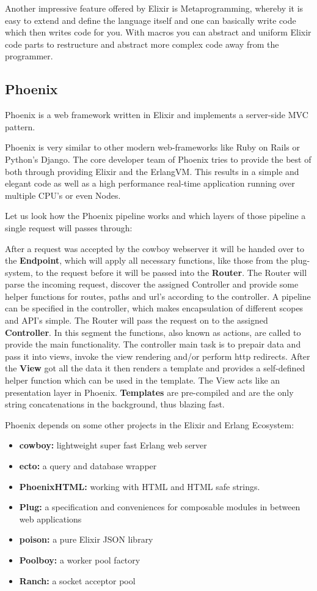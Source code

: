 Another impressive feature offered by Elixir is Metaprogramming, whereby it is easy to extend and define the language itself and one can basically write code which then writes code for you. With macros you can abstract and uniform Elixir code parts to restructure and abstract more complex code away from the programmer. 
\subsection{Phoenix}
Phoenix is a web framework written in Elixir and implements a server-side MVC pattern. 

Phoenix is very similar to other modern web-frameworks like Ruby on Rails or Python's Django. The core developer team of Phoenix tries to provide the best of both through providing  Elixir and the ErlangVM. This results in a simple and elegant code as well as a high performance real-time application running over multiple CPU's or even Nodes. 

Let us look how the Phoenix pipeline works and which layers of those pipeline a single request will passes through: 

After a request was accepted by the cowboy webserver it will be handed over to the \textbf{Endpoint}, which will apply all necessary functions, like those from the plug-system, to the request before it will be passed into the \textbf{Router}. The Router will parse the incoming request, discover the assigned Controller and provide some helper functions for routes, paths and url's according to the controller. A pipeline can be specified in the controller, which makes encapsulation of different scopes and API's simple. The Router will pass the request on to the assigned \textbf{Controller}. In this segment the functions, also known as actions, are called to provide the main functionality. The controller main task is to prepair data and pass it into views, invoke the view rendering and/or perform http redirects. After the \textbf{View} got all the data it then renders a template and provides a self-defined helper function which can be used in the template. The View acts like an presentation layer in Phoenix. \textbf{Templates} are pre-compiled and are the only string concatenations in the background, thus blazing fast. 

Phoenix depends on some other projects in the Elixir and Erlang Ecosystem: 
\begin{itemize}
\item \textbf{cowboy:} lightweight super fast Erlang web server 
\item \textbf{ecto:} a query and database wrapper
\item \textbf{PhoenixHTML:} working with HTML and HTML safe strings.
\item \textbf{Plug:} a specification and conveniences for composable modules in between web applications
\item \textbf{poison:} a pure Elixir JSON library 
\item \textbf{Poolboy:} a worker pool factory 
\item \textbf{Ranch:} a socket acceptor pool
\end{itemize}

